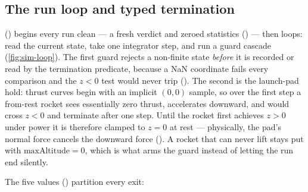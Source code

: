 \subsection{The run loop and typed termination}\label{sec:sim-runloop}


 () begins every run clean --- a
fresh  verdict and zeroed statistics () --- then loops:
read the current state, take one integrator step, and run a guard cascade
(\cref{fig:sim-loop}). The first guard rejects a non-finite state \emph{before} it is recorded or
read by the termination predicate, because a NaN coordinate fails every comparison and the $z<0$
test would never trip (). The second is the launch-pad hold: thrust
curves begin with an implicit $(0,0)$ sample, so over the first step a from-rest rocket sees
essentially zero thrust, accelerates downward, and would cross $z<0$ and terminate after one step.
Until the rocket first achieves $z>0$ under power it is therefore clamped to $z=0$ at rest ---
physically, the pad's normal force cancels the downward force
(). A rocket that can never lift stays put with
$\text{maxAltitude}=0$, which is what arms the  guard instead of letting the run
end silently.

The five  values () partition every exit:

